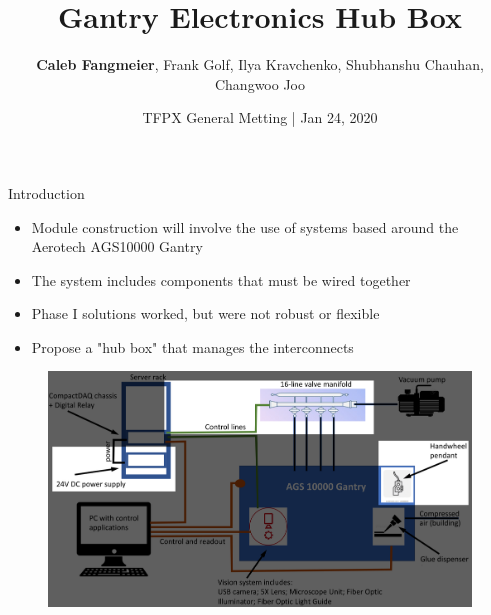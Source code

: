 \documentclass[english,aspectratio=43,8pt]{beamer}
\begin{document}
\title{Gantry Electronics Hub Box}
\author[C. Fangmeier]{\textbf{Caleb Fangmeier}, Frank Golf, Ilya Kravchenko, Shubhanshu Chauhan, Changwoo Joo}
\date{TFPX General Metting | Jan 24, 2020}


\begin{frame}[plain]
  \titlepage%
\end{frame}

\begin{frame}{Introduction}
      \begin{itemize}
          \item Module construction will involve the use of systems based around the Aerotech AGS10000 Gantry
          \item The system includes components that must be wired together
          \item Phase I solutions worked, but were not robust or flexible
          \item Propose a "hub box" that manages the interconnects
      \end{itemize}
      \begin{figure}
        \includegraphics[width=\textwidth]{figures/gantry_schematic.png}
      \end{figure}
\end{frame}
\end{document}
